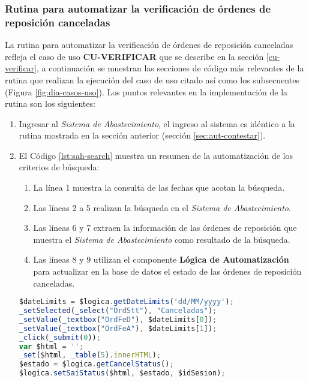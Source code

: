 \subsubsection{Rutina para automatizar la verificación de órdenes de reposición canceladas}
La rutina para automatizar la verificación de órdenes de reposición canceladas refleja el caso de uso \textbf{CU-VERIFICAR} que se describe en la sección \ref{cu-verificar}, a continuación se muestran las secciones de código más relevantes de la rutina que realizan la ejecución del caso de uso citado así como los subsecuentes (Figura \ref{fig:dia-casos-uso}). Los puntos relevantes en la implementación de la rutina son los siguientes:
\begin{enumerate}
	\item Ingresar al \textit{Sistema de Abastecimiento}, el ingreso al sistema es idéntico a la rutina mostrada en la sección anterior (sección \ref{sec:aut-contestar}).

	\item El Código \ref{lst:sah-search} muestra un resumen de la automatización de los criterios de búsqueda:
	\begin{enumerate}
		\item La línea 1 muestra la consulta de las fechas que acotan la búsqueda.
		\item Las líneas 2 a 5 realizan la búsqueda en el \textit{Sistema de Abastecimiento}.
		\item Las líneas 6 y 7 extraen la información de las órdenes de reposición que muestra el \textit{Sistema de Abastecimiento} como resultado de la búsqueda.
		\item Las líneas 8 y 9 utilizan el componente \textbf{Lógica de Automatización} para actualizar en la base de datos el estado de las órdenes de reposición canceladas.
	\end{enumerate}
	\begin{lstlisting}[language=Javascript, caption={Responder orden de reposición.}, captionpos=b, label={lst:sah-search}]
$dateLimits = $logica.getDateLimits('dd/MM/yyyy');
_setSelected(_select("OrdStt"), "Canceladas");
_setValue(_textbox("OrdFeD"), $dateLimits[0]);
_setValue(_textbox("OrdFeA"), $dateLimits[1]);
_click(_submit(0));
var $html = '';
_set($html, _table(5).innerHTML);
$estado = $logica.getCancelStatus();
$logica.setSaiStatus($html, $estado, $idSesion);
	\end{lstlisting}
\end{enumerate}
